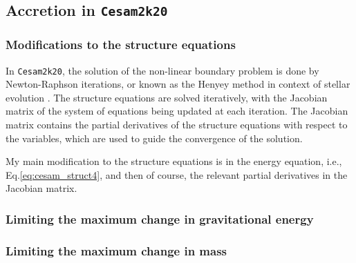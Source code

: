 \documentclass[12pt,a4paper]{article}
\newcommand{\mr}{\mathrm}
\newenvironment{outline}[1]{%
  \begin{itemize}[label=\textbullet]%
  \color{#1}%
}{%
  \end{itemize}%
}
\begin{document}
\subsection{Accretion in \texttt{Cesam2k20}}
\label{sec:accretion_cesam2k20}



\subsubsection{Modifications to the structure equations}
\label{sec:accretion_struct_eq}

In \texttt{Cesam2k20}, the solution of the non-linear boundary problem is done by Newton-Raphson iterations, or known as the
Henyey method \parencite{HenyeyEtAl1959} in context of stellar evolution \parencite{HenyeyEtAl1955}. The structure equations are solved iteratively, with the Jacobian matrix of the system of equations being updated at each iteration. The Jacobian matrix contains the partial derivatives of the structure equations with respect to the variables, which are used to guide the convergence of the solution.

My main modification to the structure equations is in the energy equation, i.e., Eq.\eqref{eq:cesam_struct4}, and then of course, the relevant partial derivatives in the Jacobian matrix. 

 
\subsubsection{Limiting the maximum change in gravitational energy}
\label{sec:limiting_grav_energy}

\subsubsection{Limiting the maximum change in mass}
\label{sec:limiting_mass_change}


\end{document}
